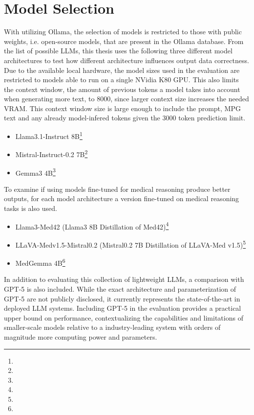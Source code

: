 \documentclass[bs, english]{stthesis}
\begin{document}
\section{Model Selection}

With utilizing Ollama, the selection of models is restricted to those with public weights, i.e. open-source models, that are present in the Ollama database. From the list of possible LLMs, this thesis uses the following three different model architectures to test how different architecture influences output data correctness.
Due to the available local hardware, the model sizes used in the evaluation are restricted to models able to run on a single NVidia K80 GPU. This also limits the context window, the amount of previous tokens a model takes into account when generating more text, to $8000$, since larger context size increases the needed VRAM. This context window size is large enough to include the prompt, MPG text and any already model-infered tokens given the $3000$ token prediction limit.

\begin{itemize}
  \item Llama3.1-Instruct 8B\footnote{} \cite{grattafioriLlama3Herd2024}
  \item Mistral-Instruct-0.2 7B\footnote{} \cite{jiangMistral7B2023}
  \item Gemma3 4B\footnote{} \cite{teamGemma3Technical2025}
\end{itemize}

To examine if using models fine-tuned for medical reasoning produce better outputs, for each model architecture a version fine-tuned on medical reasoning tasks is also used.

\begin{itemize}
  \item Llama3-Med42 (Llama3 8B Distillation of Med42)\footnote{} \cite{christopheMed42v2SuiteClinical2024}
  \item LLaVA-Medv1.5-Mistral0.2 (Mistral0.2 7B Distillation of LLaVA-Med v1.5)\footnote{} \cite{liLLaVAMedTrainingLarge2023}
  \item MedGemma 4B\footnote{} \cite{sellergrenMedGemmaTechnicalReport2025}
\end{itemize}

In addition to evaluating this collection of lightweight LLMs, a comparison with GPT-5 \cite{IntroducingGPT52025} is also included. While the exact architecture and parameterization of GPT-5 are not publicly disclosed, it currently represents the state-of-the-art in deployed LLM systems. Including GPT-5 in the evaluation provides a practical upper bound on performance, contextualizing the capabilities and limitations of smaller-scale models relative to a industry-leading system with orders of magnitude more computing power and parameters.
\end{document}
